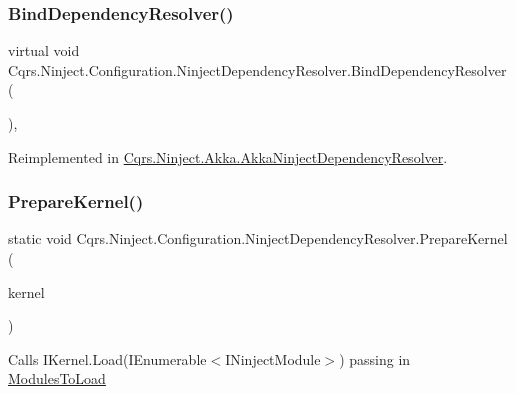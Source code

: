 \subsubsection{\texorpdfstring{Bind\+Dependency\+Resolver()}{BindDependencyResolver()}}
{\footnotesize\ttfamily virtual void Cqrs.\+Ninject.\+Configuration.\+Ninject\+Dependency\+Resolver.\+Bind\+Dependency\+Resolver (\begin{DoxyParamCaption}{ }\end{DoxyParamCaption})\hspace{0.3cm}{\ttfamily [protected]}, {\ttfamily [virtual]}}



Reimplemented in \hyperlink{classCqrs_1_1Ninject_1_1Akka_1_1AkkaNinjectDependencyResolver_ab7ba3c0a331d115073b5118673984507}{Cqrs.\+Ninject.\+Akka.\+Akka\+Ninject\+Dependency\+Resolver}.

\mbox{\label{classCqrs_1_1Ninject_1_1Configuration_1_1NinjectDependencyResolver_a00f928f47792a9945513b239a5b82293}} 
\subsubsection{\texorpdfstring{Prepare\+Kernel()}{PrepareKernel()}}
{\footnotesize\ttfamily static void Cqrs.\+Ninject.\+Configuration.\+Ninject\+Dependency\+Resolver.\+Prepare\+Kernel (\begin{DoxyParamCaption}\item[{I\+Kernel}]{kernel }\end{DoxyParamCaption})\hspace{0.3cm}{\ttfamily [static]}}



Calls I\+Kernel.\+Load(\+I\+Enumerable$<$\+I\+Ninject\+Module$>$) passing in \hyperlink{classCqrs_1_1Ninject_1_1Configuration_1_1NinjectDependencyResolver_a45264a8fae5380727d1af41bc2155381}{Modules\+To\+Load} 


